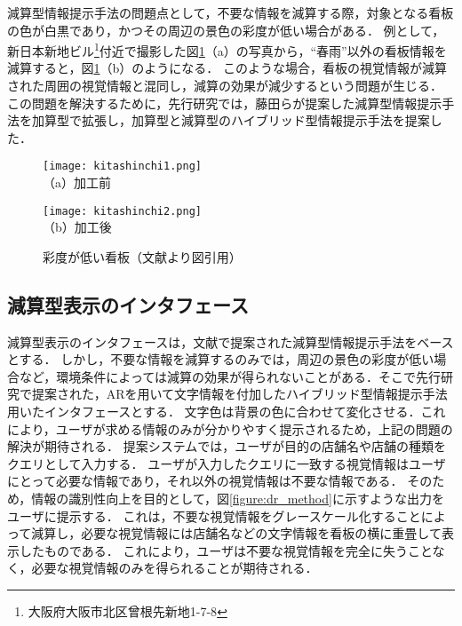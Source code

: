   減算型情報提示手法の問題点として，不要な情報を減算する際，対象となる看板の色が白黒であり，かつその周辺の景色の彩度が低い場合がある．
  例として，新日本新地ビル\footnote{大阪府大阪市北区曾根先新地1-7-8}付近で撮影した図\ref{figure:kitashinchi}（a）の写真から，``春雨''以外の看板情報を減算すると，図\ref{figure:kitashinchi}（b）のようになる．
  このような場合，看板の視覚情報が減算された周囲の視覚情報と混同し，減算の効果が減少するという問題が生じる．
  この問題を解決するために，先行研究\cite{Kitamura:2017a, Kitamura:2017b}では，藤田らが提案した減算型情報提示手法を加算型で拡張し，加算型と減算型のハイブリッド型情報提示手法を提案した．

  \begin{figure}[t]
    \begin{minipage}{0.49\hsize}
        \begin{center}
          \texttt{[image: kitashinchi1.png]}\\
          \small{（a）加工前}
        \end{center}
    \end{minipage}
    \begin{minipage}{0.49\hsize}
        \begin{center}
          \texttt{[image: kitashinchi2.png]}\\
          \small{（b）加工後}
        \end{center}
    \end{minipage}
    \vspace{2pt}
    \caption{彩度が低い看板（文献\cite{Kitamura:2017a}より図引用）}
    \label{figure:kitashinchi}
  \end{figure}


  \subsection{減算型表示のインタフェース}
    減算型表示のインタフェースは，文献\cite{Fujita:2013}で提案された減算型情報提示手法をベースとする．
    しかし，不要な情報を減算するのみでは，周辺の景色の彩度が低い場合など，環境条件によっては減算の効果が得られないことがある．そこで先行研究\cite{Kitamura:2017a, Kitamura:2017b}で提案された，ARを用いて文字情報を付加したハイブリッド型情報提示手法用いたインタフェースとする．
    文字色は背景の色に合わせて変化させる．これにより，ユーザが求める情報のみが分かりやすく提示されるため，上記の問題の解決が期待される．
    提案システムでは，ユーザが目的の店舗名や店舗の種類をクエリとして入力する．
    ユーザが入力したクエリに一致する視覚情報はユーザにとって必要な情報であり，それ以外の視覚情報は不要な情報である．
    そのため，情報の識別性向上を目的として，図\ref{figure:dr_method}に示すような出力をユーザに提示する．
    これは，不要な視覚情報をグレースケール化することによって減算し，必要な視覚情報には店舗名などの文字情報を看板の横に重畳して表示したものである．
    これにより，ユーザは不要な視覚情報を完全に失うことなく，必要な視覚情報のみを得られることが期待される．

